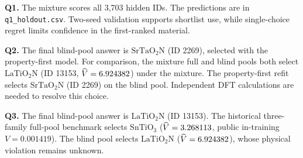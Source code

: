 \textbf{Q1.} The mixture scores all 3,703 hidden IDs. The predictions are in \texttt{q1\_holdout.csv}. Two-seed validation supports shortlist use, while single-choice regret limits confidence in the first-ranked material.

\textbf{Q2.} The final blind-pool answer is $\mathrm{SrTaO_2N}$ (ID 2269), selected with the property-first model. For comparison, the mixture full and blind pools both select $\mathrm{LaTiO_2N}$ (ID 13153, $\widehat V=6.924382$) under the mixture. The property-first refit selects $\mathrm{SrTaO_2N}$ (ID 2269) on the blind pool. Independent DFT calculations are needed to resolve this choice.

\textbf{Q3.} The final blind-pool answer is $\mathrm{LaTiO_2N}$ (ID 13153). The historical three-family full-pool benchmark selects $\mathrm{SnTiO_3}$ ($\widehat V=3.268113$, public in-training $V=0.001419$). The blind pool selects $\mathrm{LaTiO_2N}$ ($\widehat V=6.924382$), whose physical violation remains unknown.

